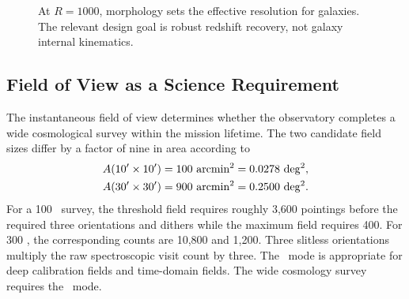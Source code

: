\begin{figure}[htbp]
\centering
{}
\caption{At $R=1000$, morphology sets the effective resolution for galaxies. The relevant design goal is robust redshift recovery, not galaxy internal kinematics.}
\label{fig:reff1000}
\end{figure}

\subsection{Field of View as a Science Requirement}

The instantaneous field of view determines whether the observatory completes a wide cosmological survey within the mission lifetime. The two candidate field sizes differ by a factor of nine in area according to
\begin{align}
  A(10'\times10') &= 100\ {\rm arcmin^2}=0.0278\ {\rm deg^2},\\
  A(30'\times30') &= 900\ {\rm arcmin^2}=0.2500\ {\rm deg^2}.
\end{align}
For a 100 \degti\ survey, the threshold field requires roughly 3,600 pointings before the required three orientations and dithers while the maximum field requires 400. For 300 \degti, the corresponding counts are 10,800 and 1,200. Three slitless orientations multiply the raw spectroscopic visit count by three. The \fovsmall\ mode is appropriate for deep calibration fields and time-domain fields. The wide cosmology survey requires the \fovlarge\ mode.

